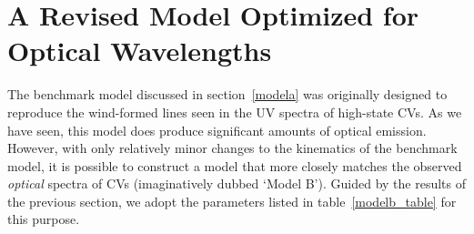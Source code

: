 \documentclass[preprint, a4paper, 11pt]{aastex}
\begin{document}
\section{A Revised Model Optimized for Optical Wavelengths}


The benchmark model discussed in section~\ref{modela} was originally
designed to reproduce the wind-formed lines seen in the UV spectra of
high-state CVs. As we have seen, this model does produce significant
amounts of optical emission. However, with only relatively minor
changes to the kinematics of the benchmark model, it is possible to
construct a model that more closely matches the observed {\em optical}
spectra of CVs (imaginatively dubbed `Model B'). Guided by the results of the previous section, we
adopt the parameters listed in table~\ref{modelb_table} for this purpose.
\end{document}

